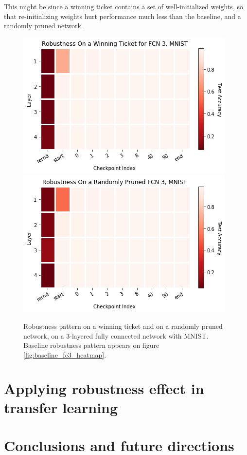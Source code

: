 \documentclass{article}
\begin{document}
This might be since a winning ticket contains a set of well-initialized weights, so that re-initializing weights hurt performance much less than the baseline, and a randomly pruned network.
\begin{figure}
  \includegraphics[width=\linewidth]{images/winning_ticket_robustness.png}
  \label{fig:winnery_robustness}
  \includegraphics[width=\linewidth]{images/random_pruned_fc3.png}
    \caption{Robustness pattern on a winning ticket and on a randomly pruned network, on a 3-layered fully connected network with MNIST. Baseline robustness pattern appears on figure \ref{fig:baseline_fc3_heatmap}.}
\end{figure}

\section{Applying robustness effect in transfer learning} \label{transfer}

\section{Conclusions and future directions} \label{conclusion}


\end{document}

